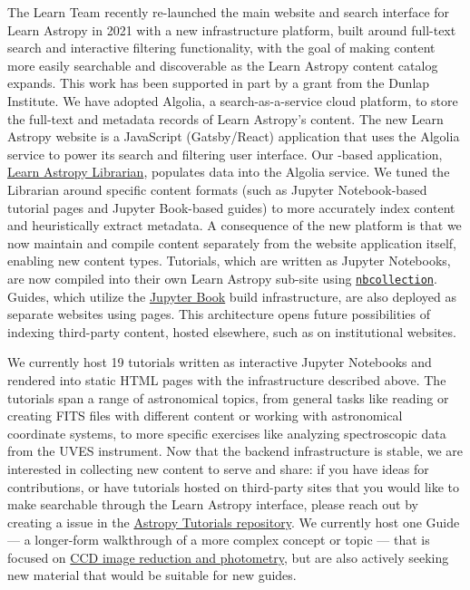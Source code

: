 \documentclass[modern]{aastex631}
\begin{document}
The Learn Team recently re-launched the main website and search interface for
Learn Astropy in 2021 with a new infrastructure platform, built around full-text
search and interactive filtering functionality, with the goal of making content
more easily searchable and discoverable as the Learn Astropy content catalog
expands.
This work has been supported in part by a grant from the Dunlap Institute.
We have adopted Algolia, a search-as-a-service cloud platform, to store the
full-text and metadata records of Learn Astropy's content.
The new Learn Astropy website is a JavaScript (Gatsby/React) application that
uses the Algolia service to power its search and filtering user interface.
Our \python-based application,
\href{https://github.com/astropy/learn-astropy-librarian/}{Learn Astropy
Librarian}, populates data into the Algolia service. We tuned the Librarian
around specific content formats (such as Jupyter Notebook-based tutorial pages
and Jupyter Book-based guides) to more accurately index content and
heuristically extract metadata.
A consequence of the new platform is that we now maintain and compile content
separately from the website application itself, enabling new content types.
Tutorials, which are written as Jupyter Notebooks, are now compiled into their
own Learn Astropy sub-site using
\href{https://github.com/astropy/nbcollection}{\texttt{nbcollection}}.
Guides, which utilize the \href{https://jupyterbook.org/}{Jupyter Book} build
infrastructure, are also deployed as separate websites using \github pages.
This architecture opens future possibilities of indexing third-party content,
hosted elsewhere, such as on institutional websites.

We currently host 19 tutorials written as interactive Jupyter Notebooks and
rendered into static HTML pages with the infrastructure described above.
The tutorials span a range of astronomical topics, from general tasks like
reading or creating FITS files with different content or working with
astronomical coordinate systems, to more specific exercises like analyzing
spectroscopic data from the UVES instrument.
Now that the backend infrastructure is stable, we are interested in collecting
new content to serve and share: if you have ideas for contributions, or have
tutorials hosted on third-party sites that you would like to make searchable
through the Learn Astropy interface, please reach out by creating a \github
issue in the \href{https://github.com/astropy/astropy-tutorials}{Astropy
Tutorials repository}.
We currently host one Guide --- a longer-form walkthrough of a more complex
concept or topic --- that is focused on
\href{http://www.astropy.org/ccd-reduction-and-photometry-guide}{CCD image
reduction and photometry}, but are also actively seeking new material that would
be suitable for new guides.
\end{document}
